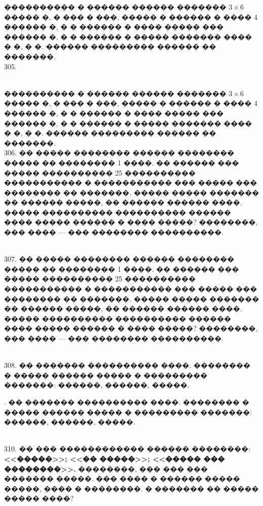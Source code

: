 \documentclass[12pt]{article}
\begin{document}
���������� � ������ ������ ������� $3\times6$ ����� �, � ��� � ���, ����� � ������ � ���� 4 ������ �, � � ������ � ���� ����� ��� ������ �, � � ������ � ����� ������� ���� � �, � �. ������ ��������� ������ �� �������.\\
305. \begin{figure}[ht!]
\end{figure}\\
���������� � ������ ������ ������� $3\times6$ ����� �, � ��� � ���, ����� � ������ � ���� 4 ������ �, � � ������ � ���� ����� ��� ������ �, � � ������ � ����� ������� ���� � �, � �. ������ ��������� ������ �� �������.\\
306. �� ����� �������� ������ �������� ����� �� �������� 1 ����. �� ������ ��� ����� ���������� 25 ���������� ����������� � ����������� ��� ����� ��� �������� �� �������. ����� ����� ������� �� ������ �����, �� ������ ������ ����. ����� ���������� ���������� ������ ���� ����� ������ � ���� �����? ��������, ��� ���� --- ��� �������� ����������.
\begin{figure}[ht!]
\end{figure}\\
307. �� ����� �������� ������ �������� ����� �� �������� 1 ����. �� ������ ��� ����� ���������� 25 ���������� ����������� � ����������� ��� ����� ��� �������� �� �������. ����� ����� ������� �� ������ �����, �� ������ ������ ����. ����� ���������� ���������� ������ ���� ����� ������ � ���� �����? ��������, ��� ���� --- ��� �������� ����������.
\begin{figure}[ht!]
\end{figure}\\
308. �� ������� ���������� ����. �������� � ����� ������ ����� � ��������� �������: ������, ������, �����.\\
\begin{figure}[ht!]
\end{figure}\newpage{}. �� ������� ���������� ����. �������� � ����� ������ ����� � ��������� �������: ������, ������, �����.\\
\begin{figure}[ht!]
\end{figure}\\
310. �� ��� ������������ ������ ��������: {\bf <<�����>>; <<�� �����>>; <<����� ��� ��������>>.} ��������, ��� ��� ��� ������� �����. ��� ���� � ������ ����� �����, ���� � ��������. � ������� �� ����� ����� ����?\\
\end{document}
